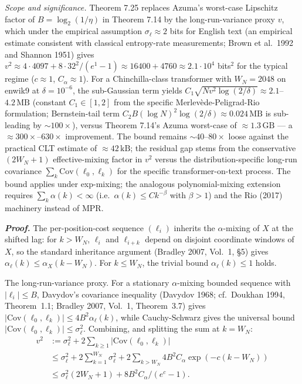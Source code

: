 \documentclass[
]{article}
\begin{document}
\emph{Scope and significance.} Theorem 7.25 replaces Azuma's
worst-case Lipschitz factor of $B = \log_2(1/\eta)$ in Theorem 7.14
by the long-run-variance proxy $v$, which under the empirical
assumption $\sigma_\ell \approx 2$ bits for English text (an
empirical estimate consistent with classical entropy-rate
measurements; Brown et al.\ 1992 and Shannon 1951) gives $v^2 \approx
4 \cdot 4097 + 8 \cdot 32^2 / (e^{1} - 1) \approx 16400 + 4760
\approx 2.1 \cdot 10^4$ bits${}^2$ for the typical regime ($c \approx 1$,
$C_\alpha \approx 1$). For a Chinchilla-class transformer with
$W_N = 2048$ on enwik9 at $\delta = 10^{-6}$, the sub-Gaussian
term yields $C_1 \sqrt{N v^2 \log(2/\delta)} \approx 2.1$--$4.2\,
\mathrm{MB}$ (constant $C_1 \in [1, 2]$ from the specific
Merlev\`ede-Peligrad-Rio formulation; Bernstein-tail term $C_2 B
(\log N)^2 \log(2/\delta) \approx 0.024\,\mathrm{MB}$ is sub-leading
by $\sim 100\times$), versus Theorem 7.14's Azuma worst-case of
$\approx 1.3\,\mathrm{GB}$ --- a $\approx 300\times$--$630\times$
improvement.
The bound remains $\sim 40$--$80\times$ loose against the practical
CLT estimate of $\approx 42\,\mathrm{kB}$; the residual gap stems
from the conservative $(2W_N+1)$ effective-mixing factor in $v^2$
versus the distribution-specific long-run covariance $\sum_k
\mathrm{Cov}(\ell_0, \ell_k)$ for the specific transformer-on-text
process. The bound applies under exp-mixing; the analogous
polynomial-mixing extension requires $\sum_k \alpha(k) < \infty$
(i.e.\ $\alpha(k) \leq C k^{-\beta}$ with $\beta > 1$) and the
Rio (2017) machinery instead of MPR.

\emph{\textbf{Proof.}} The per-position-cost sequence $(\ell_i)$
inherits the $\alpha$-mixing of $X$ at the shifted lag: for $k > W_N$,
$\ell_i$ and $\ell_{i+k}$ depend on disjoint coordinate windows of
$X$, so the standard inheritance argument (Bradley 2007, Vol.~1, §5)
gives $\alpha_{\ell}(k) \leq \alpha_X(k - W_N)$. For $k \leq W_N$,
the trivial bound $\alpha_\ell(k) \leq 1$ holds.

The long-run-variance proxy. For a stationary $\alpha$-mixing
bounded sequence with $|\ell_i| \leq B$, Davydov's covariance
inequality (Davydov 1968; cf.\ Doukhan 1994, Theorem~1.1; Bradley
2007, Vol.~1, Theorem~3.7) gives $|\mathrm{Cov}(\ell_0, \ell_k)|
\leq 4 B^2 \alpha_\ell(k)$, while Cauchy-Schwarz gives the
universal bound $|\mathrm{Cov}(\ell_0, \ell_k)| \leq \sigma_\ell^2$.
Combining, and splitting the sum at $k = W_N$:
\begin{align*}
  v^2 &:= \sigma_\ell^2 + 2 \sum_{k \geq 1} |\mathrm{Cov}(\ell_0, \ell_k)| \\
  &\leq \sigma_\ell^2 + 2 \sum_{k=1}^{W_N} \sigma_\ell^2
  + 2 \sum_{k > W_N} 4 B^2 C_\alpha \exp(-c(k - W_N)) \\
  &\leq \sigma_\ell^2 (2 W_N + 1) + 8 B^2 C_\alpha / (e^c - 1).
\end{align*}
\end{document}
